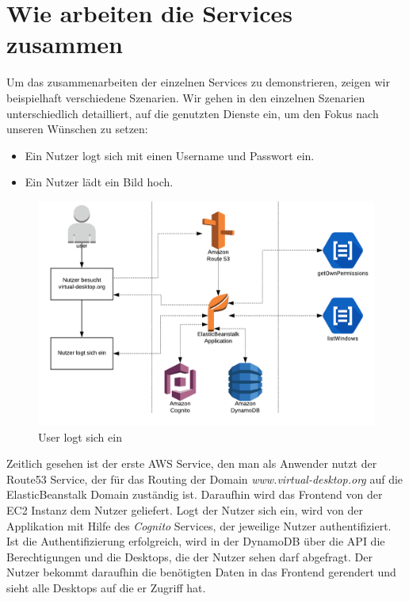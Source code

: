 \documentclass[a4paper, 12pt]{scrreprt}
\renewcommand\_{\textunderscore\allowbreak}
\begin{document}
\section{Wie arbeiten die Services zusammen}

Um das zusammenarbeiten der einzelnen Services zu demonstrieren, zeigen wir beispielhaft verschiedene Szenarien. Wir gehen in den einzelnen Szenarien unterschiedlich detailliert, auf die genutzten Dienste ein, um den Fokus nach unseren Wünschen zu setzen:
\begin{itemize}
\item Ein Nutzer logt sich mit einen Username und Passwort ein.
\item Ein Nutzer lädt ein Bild hoch.
\end{itemize}

\begin{figure}[h]
\centering
\includegraphics[scale=0.35]{Flow-Dia-1.png} 
\caption{User logt sich ein}
\end{figure}

Zeitlich gesehen ist der erste AWS Service, den man als Anwender nutzt der Route53 Service, der für das Routing der Domain \textit{www.virtual-desktop.org} auf die ElasticBeanstalk Domain zuständig ist. Daraufhin wird das Frontend von der EC2 Instanz dem Nutzer geliefert. Logt der Nutzer sich ein, wird von der Applikation mit Hilfe des \textit{Cognito} Services, der jeweilige Nutzer authentifiziert. Ist die Authentifizierung erfolgreich, wird in der DynamoDB über die API die Berechtigungen und die Desktops, die der Nutzer sehen darf abgefragt. Der Nutzer bekommt daraufhin die benötigten Daten in das Frontend gerendert und sieht alle Desktops auf die er Zugriff hat. \\
\end{document}
